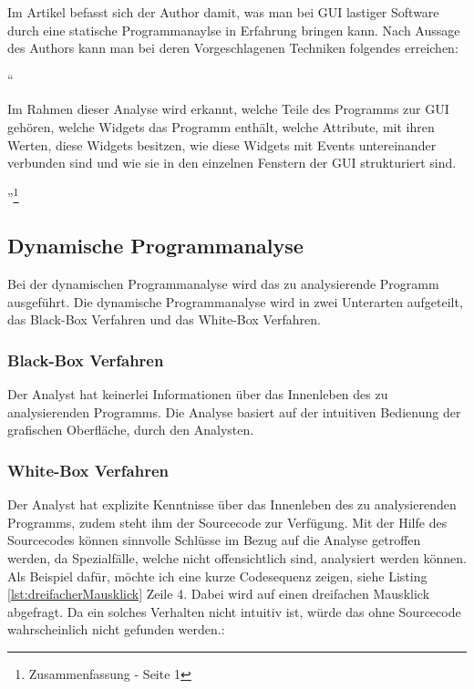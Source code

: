   Im Artikel \cite{GUIAnalysenUndBibliotheken} befasst sich der Author damit,
  was man bei \ac{GUI} lastiger Software durch eine statische Programmanaylse in
  Erfahrung bringen kann. Nach Aussage des Authors kann man bei deren
  Vorgeschlagenen Techniken folgendes erreichen:
  
  ``\begin{itshape}Im Rahmen dieser Analyse wird erkannt, welche Teile des
  Programms zur GUI gehören, welche Widgets das Programm enthält, welche
  Attribute, mit ihren Werten, diese Widgets besitzen, wie diese Widgets mit
  Events untereinander verbunden sind und wie sie in den einzelnen Fenstern der
  GUI strukturiert
  sind.\end{itshape}''\footnote{\cite{GUIAnalysenUndBibliotheken}
  Zusammenfassung - Seite 1}
    
  \subsection{Dynamische Programmanalyse}
  
  Bei der dynamischen Programmanalyse wird das zu analysierende Programm 
  ausgeführt. Die dynamische Programmanalyse wird in zwei Unterarten aufgeteilt,
  das Black-Box Verfahren und das White-Box Verfahren.
    
  \subsubsection{Black-Box Verfahren}
  
  Der Analyst hat keinerlei Informationen über das Innenleben des zu
  analysierenden Programms. Die Analyse basiert auf der intuitiven Bedienung der
  grafischen Oberfläche, durch den Analysten.
  
  \subsubsection{White-Box Verfahren}
  
  Der Analyst hat explizite Kenntnisse über das Innenleben des zu
  analysierenden Programms, zudem steht ihm der Sourcecode zur Verfügung. Mit
  der Hilfe des Sourcecodes können sinnvolle Schlüsse im Bezug auf die Analyse
  getroffen werden, da Spezialfälle, welche nicht offensichtlich sind,
  analysiert werden können. Als Beispiel dafür, möchte ich eine kurze
  Codesequenz zeigen, siehe Listing \ref{lst:dreifacherMausklick} Zeile 4.
  Dabei wird auf einen dreifachen Mausklick abgefragt. Da ein solches Verhalten nicht
  intuitiv ist, würde das ohne Sourcecode wahrscheinlich nicht gefunden werden.:
  \newline
  
